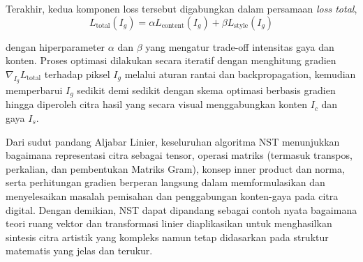 Terakhir, kedua komponen loss tersebut digabungkan dalam persamaan \textit{loss total}, 
$$
L_{\text{total}}(I_g) = \alpha L_{\text{content}}(I_g) + \beta L_{\text{style}}(I_g)
$$

dengan hiperparameter $\alpha$ dan $\beta$ yang mengatur trade-off intensitas gaya dan konten. Proses optimasi dilakukan secara iteratif dengan menghitung gradien $\nabla_{I_g} L_{\text{total}}$ terhadap piksel $I_g$ melalui aturan rantai dan backpropagation, kemudian memperbarui $I_g$ sedikit demi sedikit dengan skema optimasi berbasis gradien hingga diperoleh citra hasil yang secara visual menggabungkan konten $I_c$ dan gaya $I_s$.

Dari sudut pandang Aljabar Linier, keseluruhan algoritma NST menunjukkan bagaimana representasi citra sebagai tensor, operasi matriks (termasuk transpos, perkalian, dan pembentukan Matriks Gram), konsep inner product dan norma, serta perhitungan gradien berperan langsung dalam memformulasikan dan menyelesaikan masalah pemisahan dan penggabungan konten-gaya pada citra digital. Dengan demikian, NST dapat dipandang sebagai contoh nyata bagaimana teori ruang vektor dan transformasi linier diaplikasikan untuk menghasilkan sintesis citra artistik yang kompleks namun tetap didasarkan pada struktur matematis yang jelas dan terukur.

